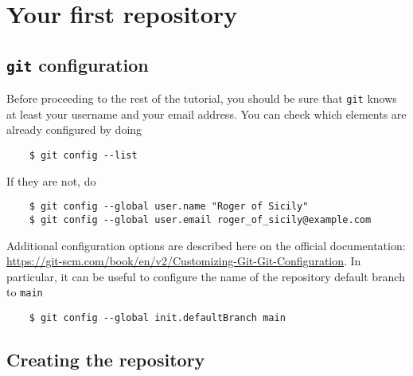 \documentclass{article}
\begin{document}
\section{Your first repository}

\subsection{\texttt{git} configuration}

Before proceeding to the rest of the tutorial, you should be sure that \texttt{git} knows at least your username and your email address. You can check which elements are already configured by doing
\begin{lstlisting}
    $ git config --list
\end{lstlisting}

If they are not, do
\begin{lstlisting}
    $ git config --global user.name "Roger of Sicily"
    $ git config --global user.email roger_of_sicily@example.com
\end{lstlisting}

Additional configuration options are described here on the official documentation: \\ \url{https://git-scm.com/book/en/v2/Customizing-Git-Git-Configuration}. In particular, it can be useful to configure the name of the repository default branch to \texttt{main}
\begin{lstlisting}
    $ git config --global init.defaultBranch main
\end{lstlisting}

\subsection{Creating the repository}
\end{document}
